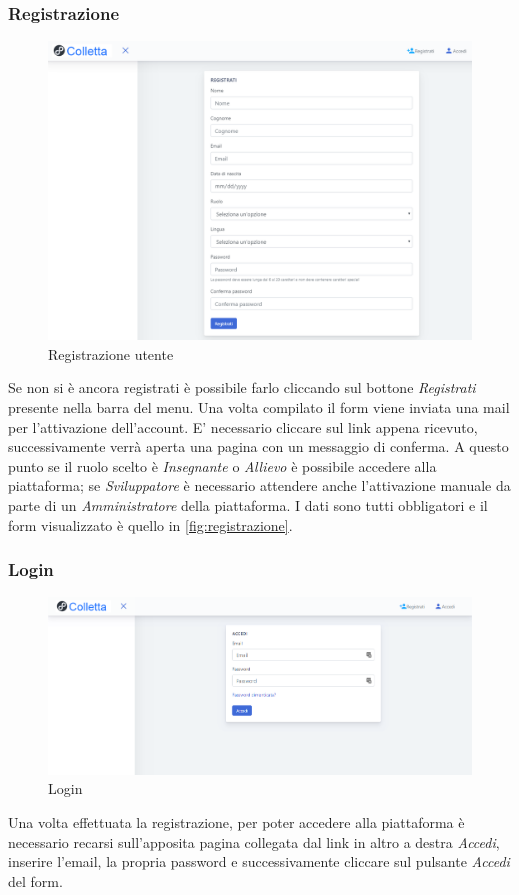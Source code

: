     \subsubsection{Registrazione}
    	\begin{figure}[H]
        	\centering
        	\includegraphics[width=1\linewidth]{sez/img/autenticazione/formRegistrazione.PNG} 
        	\caption{Registrazione utente}\label{fig:registrazione}
    	\end{figure}
	   Se non si è ancora registrati è possibile farlo cliccando sul bottone \textit{Registrati} presente nella barra del menu. Una volta compilato il {form} viene inviata una mail per l'attivazione dell'account. E' necessario cliccare sul link appena ricevuto, successivamente verrà aperta una pagina con un messaggio di conferma. A questo punto se il ruolo scelto è \textit{Insegnante} o \textit{Allievo} è possibile accedere alla piattaforma; se \textit{Sviluppatore} è necessario attendere anche l'attivazione manuale da parte di un  \textit{Amministratore} della piattaforma. I dati sono tutti obbligatori e il form visualizzato è quello in \autoref{fig:registrazione}.
    \subsubsection{Login}
    	\begin{figure}[H]
        	\centering
        	\includegraphics[width=1\linewidth]{sez/img/autenticazione/formAccedi.PNG} 
        	\caption{Login}\label{fig:1}
    	\end{figure}
Una volta effettuata la registrazione, per poter accedere alla piattaforma è necessario recarsi sull'apposita pagina collegata dal link in altro a destra \textit{Accedi}, inserire l'email, la propria password e successivamente cliccare sul pulsante \textit{Accedi} del form.

